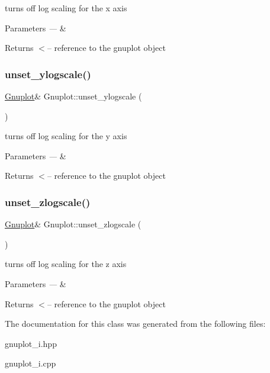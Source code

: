 turns off log scaling for the x axis


\begin{DoxyParams}{Parameters}
{\em ---} & \\
\hline
\end{DoxyParams}
\begin{DoxyReturn}{Returns}
$<$-- reference to the gnuplot object 
\end{DoxyReturn}
\mbox{\label{classGnuplot_a9217543dd49c4802b1194d42c5e10b6d}} 
\subsubsection{\texorpdfstring{unset\+\_\+ylogscale()}{unset\_ylogscale()}}
{\footnotesize\ttfamily \hyperlink{classGnuplot}{Gnuplot}\& Gnuplot\+::unset\+\_\+ylogscale (\begin{DoxyParamCaption}{ }\end{DoxyParamCaption})\hspace{0.3cm}{\ttfamily [inline]}}

turns off log scaling for the y axis


\begin{DoxyParams}{Parameters}
{\em ---} & \\
\hline
\end{DoxyParams}
\begin{DoxyReturn}{Returns}
$<$-- reference to the gnuplot object 
\end{DoxyReturn}
\mbox{\label{classGnuplot_afa67f022ca344593b054d7f2e3406c7e}} 
\subsubsection{\texorpdfstring{unset\+\_\+zlogscale()}{unset\_zlogscale()}}
{\footnotesize\ttfamily \hyperlink{classGnuplot}{Gnuplot}\& Gnuplot\+::unset\+\_\+zlogscale (\begin{DoxyParamCaption}{ }\end{DoxyParamCaption})\hspace{0.3cm}{\ttfamily [inline]}}

turns off log scaling for the z axis


\begin{DoxyParams}{Parameters}
{\em ---} & \\
\hline
\end{DoxyParams}
\begin{DoxyReturn}{Returns}
$<$-- reference to the gnuplot object 
\end{DoxyReturn}


The documentation for this class was generated from the following files\+:\begin{DoxyCompactItemize}
\item 
gnuplot\+\_\+i.\+hpp\item 
gnuplot\+\_\+i.\+cpp\end{DoxyCompactItemize}

